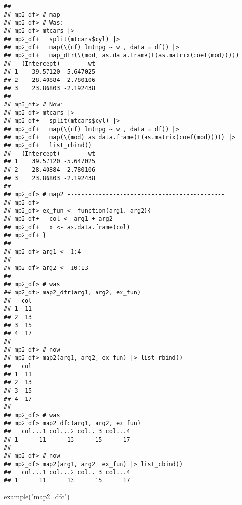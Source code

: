 \documentclass[
]{book}
\newenvironment{Shaded}{\begin{snugshade}}{\end{snugshade}}
\newcommand{\FunctionTok}[1]{\textcolor[rgb]{0.00,0.00,0.00}{#1}}
\newcommand{\NormalTok}[1]{#1}
\newcommand{\StringTok}[1]{\textcolor[rgb]{0.31,0.60,0.02}{#1}}
\begin{document}
\begin{verbatim}
## 
## mp2_df> # map ---------------------------------------------
## mp2_df> # Was:
## mp2_df> mtcars |>
## mp2_df+   split(mtcars$cyl) |>
## mp2_df+   map(\(df) lm(mpg ~ wt, data = df)) |>
## mp2_df+   map_dfr(\(mod) as.data.frame(t(as.matrix(coef(mod)))))
##   (Intercept)        wt
## 1    39.57120 -5.647025
## 2    28.40884 -2.780106
## 3    23.86803 -2.192438
## 
## mp2_df> # Now:
## mp2_df> mtcars |>
## mp2_df+   split(mtcars$cyl) |>
## mp2_df+   map(\(df) lm(mpg ~ wt, data = df)) |>
## mp2_df+   map(\(mod) as.data.frame(t(as.matrix(coef(mod))))) |>
## mp2_df+   list_rbind()
##   (Intercept)        wt
## 1    39.57120 -5.647025
## 2    28.40884 -2.780106
## 3    23.86803 -2.192438
## 
## mp2_df> # map2 ---------------------------------------------
## mp2_df> 
## mp2_df> ex_fun <- function(arg1, arg2){
## mp2_df+   col <- arg1 + arg2
## mp2_df+   x <- as.data.frame(col)
## mp2_df+ }
## 
## mp2_df> arg1 <- 1:4
## 
## mp2_df> arg2 <- 10:13
## 
## mp2_df> # was
## mp2_df> map2_dfr(arg1, arg2, ex_fun)
##   col
## 1  11
## 2  13
## 3  15
## 4  17
## 
## mp2_df> # now
## mp2_df> map2(arg1, arg2, ex_fun) |> list_rbind()
##   col
## 1  11
## 2  13
## 3  15
## 4  17
## 
## mp2_df> # was
## mp2_df> map2_dfc(arg1, arg2, ex_fun)
##   col...1 col...2 col...3 col...4
## 1      11      13      15      17
## 
## mp2_df> # now
## mp2_df> map2(arg1, arg2, ex_fun) |> list_cbind()
##   col...1 col...2 col...3 col...4
## 1      11      13      15      17
\end{verbatim}

\begin{Shaded}
\begin{Highlighting}[]
\FunctionTok{example}\NormalTok{(}\StringTok{"map2\_dfc"}\NormalTok{)}
\end{Highlighting}
\end{Shaded}
\end{document}
